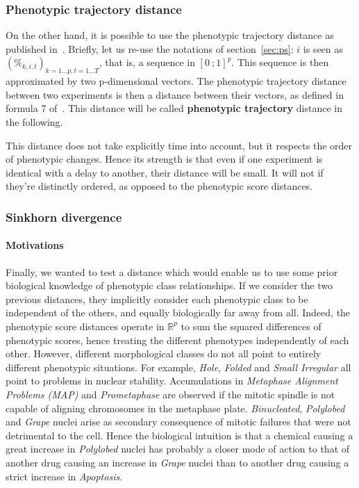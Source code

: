 \subsubsection{Phenotypic trajectory distance}
On the other hand, it is possible to use the phenotypic trajectory distance as published in~\cite{Walter2010}. Briefly, let us re-use the notations of section~\ref{sec:ps}: $i$ is seen as $(\%_{k,i,t})_{k=1\ldots p,t=1\ldots T}$, that is, a sequence in $[0~;1]^p$. This sequence is then approximated by two p-dimensional vectors. The phenotypic trajectory distance between two experiments is then a distance between their vectors, as defined in formula 7 of~\cite{Walter2010}. This distance will be called \textbf{phenotypic trajectory} distance in the following.

This distance does not take explicitly time into account, but it respects the order of phenotypic changes. Hence its strength is that even if one experiment is identical with a delay to another, their distance will be small. It will not if they're distinctly ordered, as opposed to the phenotypic score distances.

\subsubsection{Sinkhorn divergence}
\paragraph*{Motivations\\}
Finally, we wanted to test a distance which would enable us to use
some prior biological knowledge of phenotypic class relationships. If
we consider the two previous distances, they implicitly consider each
phenotypic class to be independent of the others, and equally
biologically far away from all. Indeed, the phenotypic score distances
operate in $\mathbb{R}^p$ to sum the squared differences of phenotypic
scores, hence treating the different phenotypes independently of
each other. However, different morphological classes do not all point
to entirely different phenotypic situations. For example,
\textit{Hole}, \textit{Folded} and \textit{Small Irregular} all point
to problems in nuclear stability. Accumulations in \textit{Metaphase Alignment Problems
  (MAP)} and \textit{Prometaphase} are observed if the mitotic spindle
is not capable of aligning chromosomes in the metaphase plate. 
\textit{Binucleated}, \textit{Polylobed} and \textit{Grape} nuclei arise as secondary consequence of mitotic failures that were not detrimental to the cell.%
Hence the biological intuition is that a chemical
causing a great increase in \textit{Polylobed} nuclei has probably a
closer mode of action to that of another drug causing an increase in \textit{Grape} nuclei than to another drug causing
a strict increase in \textit{Apoptosis}. 

